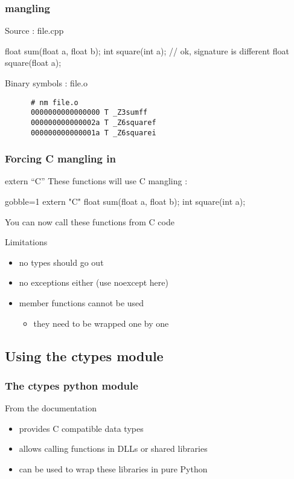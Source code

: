 \begin{frame}[fragile]
  \frametitle{\cpp mangling}
  \begin{exampleblock}{Source : file.cpp}
    \begin{cppcode*}{}
      float sum(float a, float b);
      int square(int a);
      // ok, signature is different
      float square(float a);
    \end{cppcode*}
  \end{exampleblock}
  \begin{block}{Binary symbols : file.o}
    \begin{verbatim}
      # nm file.o
      0000000000000000 T _Z3sumff
      000000000000002a T _Z6squaref
      000000000000001a T _Z6squarei
    \end{verbatim}
  \end{block}  
\end{frame}

\begin{frame}[fragile]
  \frametitle{Forcing C mangling in \cpp}
  \begin{block}{extern ``C''}
    These functions will use C mangling :
    \begin{cppcode*}{gobble=1}
      extern "C" {
        float sum(float a, float b);
        int square(int a);
      }
    \end{cppcode*}
  \end{block}
  \pause
  You can now call these \cpp functions from C code
  \pause
  \begin{alertblock}{Limitations}
    \begin{itemize}
    \item no \cpp types should go out
    \item no exceptions either (use noexcept here)
    \item member functions cannot be used
      \begin{itemize}
      \item they need to be wrapped one by one
      \end{itemize}
    \end{itemize}
  \end{alertblock}
\end{frame}

\subsection[ctypes]{Using the ctypes module}

\begin{frame}[fragile]
  \frametitle{The ctypes python module}
  \begin{block}{From the documentation}
    \begin{itemize}
    \item provides C compatible data types
    \item allows calling functions in DLLs or shared libraries
    \item can be used to wrap these libraries in pure Python
    \end{itemize}
  \end{block}
\end{frame}

